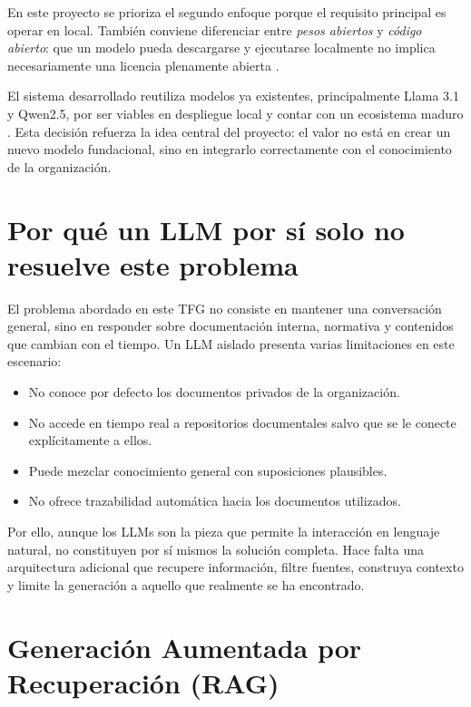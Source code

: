 En este proyecto se prioriza el segundo enfoque porque el requisito principal es operar en local. También conviene diferenciar entre \textit{pesos abiertos} y \textit{código abierto}: que un modelo pueda descargarse y ejecutarse localmente no implica necesariamente una licencia plenamente abierta \cite{meta2024llama31hf,google2024gemmaterms,qwen2024qwen25license}.

El sistema desarrollado reutiliza modelos ya existentes, principalmente Llama 3.1 y Qwen2.5, por ser viables en despliegue local y contar con un ecosistema maduro \cite{meta2024llama31,qwen2024qwen25blog}. Esta decisión refuerza la idea central del proyecto: el valor no está en crear un nuevo modelo fundacional, sino en integrarlo correctamente con el conocimiento de la organización.

\section{Por qué un LLM por sí solo no resuelve este problema}

El problema abordado en este TFG no consiste en mantener una conversación general, sino en responder sobre documentación interna, normativa y contenidos que cambian con el tiempo. Un LLM aislado presenta varias limitaciones en este escenario:

\begin{itemize}
    \item No conoce por defecto los documentos privados de la organización.
    \item No accede en tiempo real a repositorios documentales salvo que se le conecte explícitamente a ellos.
    \item Puede mezclar conocimiento general con suposiciones plausibles.
    \item No ofrece trazabilidad automática hacia los documentos utilizados.
\end{itemize}

Por ello, aunque los LLMs son la pieza que permite la interacción en lenguaje natural, no constituyen por sí mismos la solución completa. Hace falta una arquitectura adicional que recupere información, filtre fuentes, construya contexto y limite la generación a aquello que realmente se ha encontrado.

\section{Generación Aumentada por Recuperación (RAG)}

